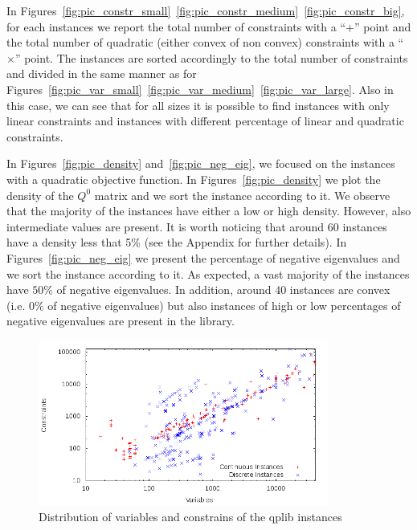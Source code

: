 In Figures~\ref{fig:pic_constr_small}~\ref{fig:pic_constr_medium}~\ref{fig:pic_constr_big},
for each instances we report the total number of constraints with a
``$+$'' point and the total number of quadratic (either convex of non
convex) constraints with a ``$\times$'' point. The instances are sorted
accordingly to the total number of constraints  and divided in the
same manner as for Figures~\ref{fig:pic_var_small}~\ref{fig:pic_var_medium}~\ref{fig:pic_var_large}.
Also in this case, we can see that for all sizes it is possible to
find instances with only linear constraints and instances with
different percentage of linear and quadratic constraints.

In Figures~\ref{fig:pic_density} and~\ref{fig:pic_neg_eig},  we
focused on the instances with a quadratic objective function.
In Figures~\ref{fig:pic_density} we plot the density of the $Q^0$
matrix and we sort the instance according to it. We observe that the
majority of the instances have either a low or high density. However,
also intermediate values are present. It is worth noticing that around 60 instances have a 
density less that 5\% (see the Appendix for further details). 
In Figures~\ref{fig:pic_neg_eig} we present  the percentage of
negative eigenvalues and we sort the instance according to it. As
expected, a vast majority of the instances have $50\% $ of negative
eigenvalues. In addition, around $40$ instances are convex (i.e. $0\%$
of negative eigenvalues) but also instances of high or low percentages
of negative eigenvalues are present in the library.





\begin{figure}\centering
  \includegraphics[width=0.85\textwidth]{pic_overview.png}
  \caption{Distribution of variables and constrains  of the qplib
instances \label{fig:1}}
\end{figure}

